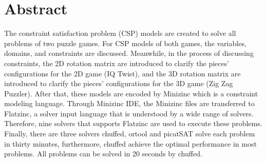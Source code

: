 \chapter*{Abstract}
\vspace{-1em}
The constraint satisfaction problem (CSP) models are created to solve all problems of two puzzle games. For CSP models of both games, the variables, domains, and constraints are discussed. Meanwhile, in the process of discussing constraints, the 2D rotation matrix are introduced to clarify the pieces' configurations for the 2D game (IQ Twist), and the 3D rotation matrix are introduced to clarify the pieces' configurations for the 3D game (Zig Zag Puzzler). After that, these models are encoded by Minizinc which is a constraint modeling language. Through Minizinc IDE, the Minizinc files are transferred to Flatzinc, a solver input language that is understood by a wide range of solvers. Therefore, nine solvers that supports Flatzinc are used to execute these problems. Finally, there are three solvers chuffed, ortool and picatSAT solve each problem in thirty minutes, furthermore, chuffed achieve the optimal performance in most problems. All problems can be solved in 20 seconds by chuffed.

